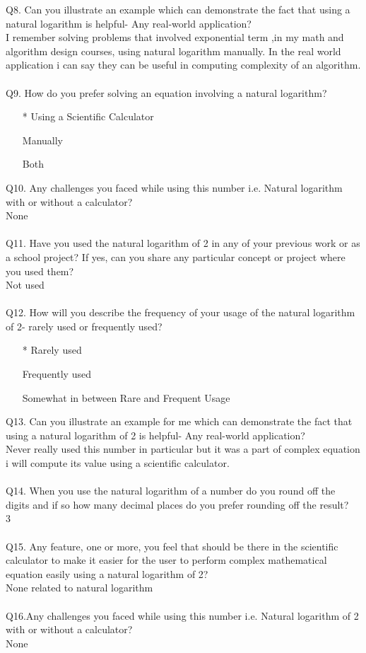 \documentclass{article}
\makeatletter
\newcommand*{\radiobutton}{%
  \@ifstar{\@radiobutton0}{\@radiobutton1}%
}
\newcommand*{\@radiobutton}[1]{%
  \begin{tikzpicture}
    \pgfmathsetlengthmacro\radius{height("X")/2}
    \draw[radius=\radius] circle;
    \ifcase#1 \fill[radius=.6*\radius] circle;\fi
  \end{tikzpicture}%
}
\makeatother
\begin{document}
Q8. Can you illustrate an example which can demonstrate the fact that using a natural logarithm is helpful- Any real-world application?\\
I remember solving problems that involved exponential term ,in my math and algorithm design courses, using natural logarithm manually. In the real world application i can say they can be useful in computing complexity of an algorithm.\\\\
Q9. How do you prefer solving an equation involving a natural logarithm? 
\begin{itemize}
\item[\radiobutton*] Using a Scientific Calculator
\item[\radiobutton] Manually
\item[\radiobutton] Both
\end{itemize}
Q10. Any challenges you faced while using this number i.e. Natural logarithm with or without a calculator?\\
None\\\\
Q11. Have you used the natural logarithm of 2 in any of your previous work or as a school project? If yes, can you share any particular concept or project where you used them?\\
Not used\\\\
Q12. How will you describe the frequency of your usage of the natural logarithm of 2- rarely used or frequently used?\\
\begin{itemize}
\item[\radiobutton*] Rarely used
\item[\radiobutton] Frequently used
\item[\radiobutton] Somewhat in between Rare and Frequent Usage
\end{itemize}
Q13. Can you illustrate an example for me which can demonstrate the fact that using a natural logarithm of 2 is helpful- Any real-world application?\\
Never really used this number in particular but it was a part of complex equation i will compute its value using a scientific calculator.\\\\
Q14. When you use the natural logarithm of a number do you round off the digits and if so how many decimal places do you prefer rounding off the result? \\
3\\\\
Q15. Any feature, one or more, you feel that should be there in the scientific calculator to make it easier for the user to perform complex mathematical equation easily using a natural logarithm of 2?\\
None related to natural logarithm\\\\
Q16.Any challenges you faced while using this number i.e. Natural logarithm of 2 with or without a calculator?\\
None\\
\end{document}
